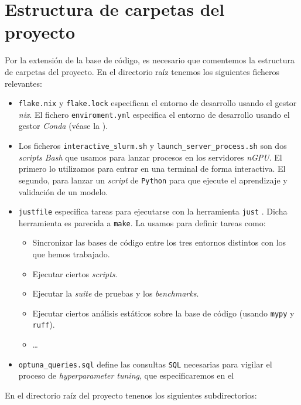 \section{Estructura de carpetas del proyecto} \label{isec:estructura_carpetas}

Por la extensión de la base de código, es necesario que comentemos la estructura de carpetas del proyecto. En el directorio raíz tenemos los siguientes ficheros relevantes:

\begin{itemize}
	\item \lstinline{flake.nix} y \lstinline{flake.lock} especifican el entorno de desarrollo usando el gestor \textit{nix}. El fichero \lstinline{enviroment.yml} especifica el entorno de desarrollo usando el gestor \textit{Conda} (véase la ).
	\item Los ficheros \lstinline{interactive_slurm.sh} y \lstinline{launch_server_process.sh} son dos \textit{scripts Bash} que usamos para lanzar procesos en los servidores \textit{nGPU}. El primero lo utilizamos para entrar en una terminal de forma interactiva. El segundo, para lanzar un \textit{script} de \lstinline{Python} para que ejecute el aprendizaje y validación de un modelo.
	\item \lstinline{justfile} especifica tareas para ejecutarse con la herramienta \lstinline{just} \cite{informatica:just}. Dicha herramienta es parecida a \lstinline{make}. La usamos para definir tareas como:
	      \begin{itemize}
		      \item Sincronizar las bases de código entre los tres entornos distintos con los que hemos trabajado.
		      \item Ejecutar ciertos \textit{scripts}.
		      \item Ejecutar la \textit{suite} de pruebas y los \textit{benchmarks}.
		      \item Ejecutar ciertos análisis estáticos sobre la base de código (usando \lstinline{mypy} y \lstinline{ruff}).
		      \item \ldots
	      \end{itemize}
	\item \lstinline{optuna_queries.sql} define las consultas \lstinline{SQL} necesarias para vigilar el proceso de \textit{hyperparameter tuning}, que especificaremos en el 
\end{itemize}

En el directorio raíz del proyecto tenenos los siguientes subdirectorios:

